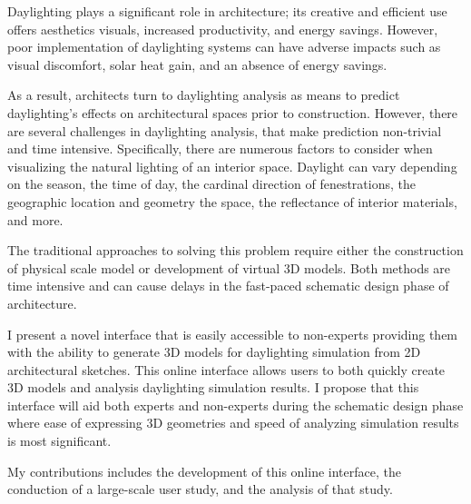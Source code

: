 Daylighting plays a significant role in architecture; its creative and efficient use offers aesthetics visuals, increased productivity, and energy savings. However, poor implementation of daylighting systems can have adverse impacts such as visual discomfort, solar heat gain, and an absence of energy savings. 

As a result, architects turn to daylighting analysis as means to predict daylighting's effects on architectural spaces prior to construction. However, there are several challenges in daylighting analysis, that make prediction non-trivial and time intensive. Specifically, there are numerous factors to consider when visualizing the natural lighting of an interior space. Daylight can vary depending on the season, the time of day, the cardinal direction of fenestrations,  the geographic location and geometry the space,  the reflectance of interior materials, and more.  

The traditional approaches to solving this problem require either the construction of physical scale model or development of virtual 3D models. Both methods are time intensive and can cause delays in the fast-paced schematic design phase of architecture.  

I present a novel interface that is easily accessible to non-experts providing them with the ability to generate 3D models for daylighting simulation from 2D architectural sketches. This online interface allows users to both quickly create 3D models and analysis daylighting simulation results. I propose that this interface will aid both experts and non-experts during the schematic design phase where ease of expressing 3D geometries and speed of analyzing simulation results is most significant. 

My contributions includes the development of this online interface, the conduction of a large-scale user study, and the analysis of that study.
